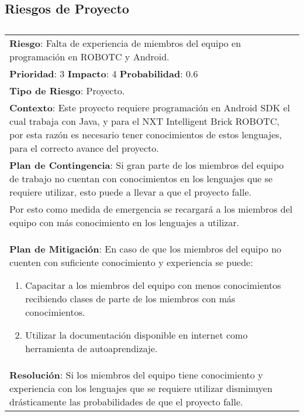 \subsection{Riesgos de Proyecto}
\begin{table}[htbp!]
  \begin{tabular}{|p{15cm}|}\hline
    {\bf Riesgo}: Falta de experiencia de miembros del equipo en programaci\'on en ROBOTC y Android.\\%
    {\bf Prioridad}: 3  {\bf Impacto}: 4  {\bf Probabilidad}: 0.6\\%
    {\bf Tipo de Riesgo}: Proyecto.\\%
    {\bf Contexto}: Este proyecto requiere programaci\'on en Android SDK el cual trabaja con Java, y para el NXT Intelligent Brick ROBOTC, por esta raz\'on es necesario tener conocimientos de estos lenguajes, para el correcto avance del proyecto.\\%
    {\bf Plan de Contingencia}: Si gran parte de los miembros del equipo de trabajo no cuentan con conocimientos en los lenguajes que se requiere utilizar, esto puede a llevar a que el proyecto falle.\\Por esto como medida de emergencia se recargar\'a a los miembros del equipo con m\'as conocimiento en los lenguajes a utilizar.\\%
    {\bf Plan de Mitigaci\'on}: En caso de que los miembros del equipo no cuenten con suficiente conocimiento y experiencia se puede:\begin{enumerate}\item Capacitar a los miembros del equipo con menos conocimientos recibiendo clases de parte de los miembros con m\'as conocimientos.\item Utilizar la documentaci\'on disponible en internet como herramienta de autoaprendizaje.\end{enumerate}\\%
    {\bf Resoluci\'on}: Si los miembros del equipo tiene conocimiento y experiencia con los lenguajes que se requiere utilizar disminuyen dr\'asticamente las probabilidades de que el proyecto falle.\\\hline
  \end{tabular}
  \caption{}
  \label{table:R5}
\end{table}


